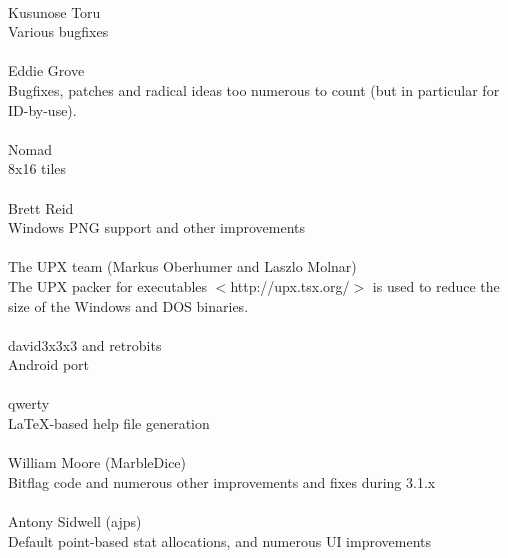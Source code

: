 \paragraph{}
Kusunose Toru \\
Various bugfixes

\paragraph{}
Eddie Grove \\
Bugfixes, patches and radical ideas too numerous to count (but in particular
for ID-by-use).

\paragraph{}
Nomad \\
8x16 tiles

\paragraph{}
Brett Reid \\
Windows PNG support and other improvements

\paragraph{}
The UPX team (Markus Oberhumer and Laszlo Molnar) \\
The UPX packer for executables $<$http://upx.tsx.org/$>$ is used to reduce
the size of the Windows and DOS binaries.

\paragraph{}
david3x3x3 and retrobits \\
Android port

\paragraph{}
qwerty \\
LaTeX-based help file generation

\paragraph{}
William Moore (MarbleDice) \\
Bitflag code and numerous other improvements and fixes during 3.1.x

\paragraph{}
Antony Sidwell (ajps) \\
Default point-based stat allocations, and numerous UI improvements
